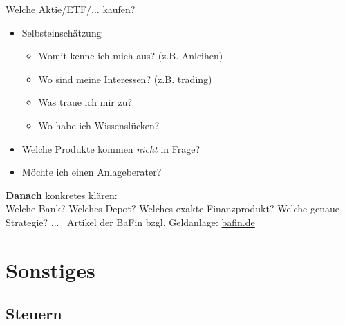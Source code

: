 \documentclass{beamer}
\begin{document}
			\begin{frame}{Welche Aktie/ETF/... kaufen?}
				\begin{itemize}
					\item Selbsteinschätzung
					\begin{itemize}
						\item Womit kenne ich mich aus? (z.B. Anleihen)
						\item Wo sind meine Interessen? (z.B. trading)
						\item Was traue ich mir zu?
						\item Wo habe ich Wissenslücken?
					\end{itemize}\pause
					\item Welche Produkte kommen \textit{nicht} in Frage? \pause
					\item Möchte ich einen Anlageberater? \pause
				\end{itemize}\n
				\textbf{Danach} konkretes klären:\\
				Welche Bank? Welches Depot? Welches exakte Finanzprodukt? Welche genaue Strategie? ...\n
				\textrightarrow\ Artikel der BaFin bzgl. Geldanlage: \href{https://www.bafin.de/SharedDocs/Veroeffentlichungen/DE/Fachartikel/2015/fa_bj_1506_geldanlage.html}{bafin.de}
			\end{frame}
	
	\section{Sonstiges}
	
		\begin{frame}
		\end{frame}
		
		\subsection{Steuern}
	
\end{document}

